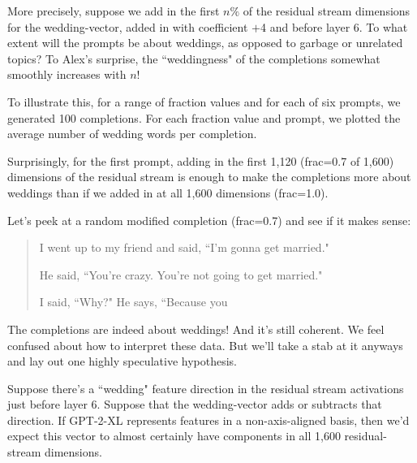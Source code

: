 \documentclass[10pt]{article}
\begin{document}
More precisely, suppose we add in the first $n\%$ of the residual stream dimensions for the {\textvisiblespace}wedding-vector, added in with coefficient $+$4 and before layer 6. To what extent will the prompts be about weddings, as opposed to garbage or unrelated topics? To Alex's surprise, the ``weddingness" of the completions somewhat smoothly increases with $n$!

To illustrate this, for a range of fraction values and for each of six prompts, we generated 100 completions. For each fraction value and prompt, we plotted the average number of wedding words per completion.%




Surprisingly, for the first prompt, adding in the first 1,120 (frac=0.7 of 1,600) dimensions of the residual stream is enough to make the completions more about weddings than if we added in at all 1,600 dimensions (frac=1.0). 

Let's peek at a random modified completion (frac=0.7) and see if it makes sense:

\begin{quote}
I went up to my friend and said, ``I'm gonna get married."

He said, ``You're crazy. You're not going to get married."

I said, ``Why?" He says, ``Because you
\end{quote}

The completions are indeed about weddings! And it's still coherent. We feel confused about how to interpret these data. But we'll take a stab at it anyways and lay out one highly speculative hypothesis.

Suppose there's a ``wedding" feature direction in the residual stream activations just before layer 6. Suppose that the {\textvisiblespace}wedding-\textvisiblespace vector adds or subtracts that direction. If GPT-2-XL represents features in a non-axis-aligned basis, then we'd expect this vector to almost certainly have components in all 1,600 residual-stream dimensions.
\end{document}

